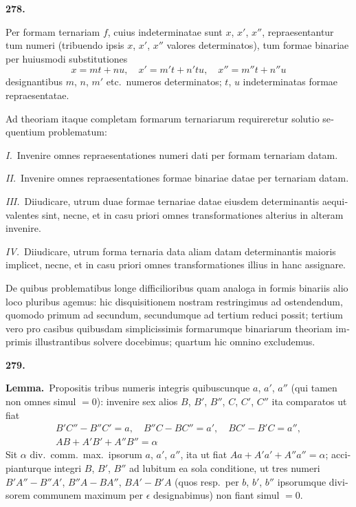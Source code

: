\documentclass[12pt,a4paper]{article}
\theoremstyle{plain}
\theoremstyle{definition}
\theoremstyle{remark}
\begin{document}
\begin{otherlanguage}{latin}

\textbf{278.}

Per formam ternariam $f$, cuius indeterminatae sunt $x$, $x'$, $x''$, repraesentantur tum numeri (tribuendo ipsis $x$, $x'$, $x''$ valores determinatos), tum formae binariae per huiusmodi substitutiones
\[
x = mt + nu, \quad x' = m't + n't u, \quad x'' = m''t + n''u
\]
designantibus $m$, $n$, $m'$ etc.\ numeros determinatos; $t$, $u$ indeterminatas formae repraesentatae.

Ad theoriam itaque completam formarum ternariarum requireretur solutio sequentium problematum:

\textit{I.}\ Invenire omnes repraesentationes numeri dati per formam ternariam datam.

\textit{II.}\ Invenire omnes repraesentationes formae binariae datae per ternariam datam.

\textit{III.}\ Diiudicare, utrum duae formae ternariae datae eiusdem determinantis aequivalentes sint, necne, et in casu priori omnes transformationes alterius in alteram invenire.

\textit{IV.}\ Diiudicare, utrum forma ternaria data aliam datam determinantis maioris implicet, necne, et in casu priori omnes transformationes illius in hanc assignare.

De quibus problematibus longe difficilioribus quam analoga in formis binariis alio loco pluribus agemus: hic disquisitionem nostram restringimus ad ostendendum, quomodo primum ad secundum, secundumque ad tertium reduci possit; tertium vero pro casibus quibusdam simplicissimis formarumque binariarum theoriam imprimis illustrantibus solvere docebimus; quartum hic omnino excludemus.

\bigskip

\textbf{279.}

\textbf{Lemma.}\ Propositis tribus numeris integris quibuscunque $a$, $a'$, $a''$ (qui tamen non omnes simul $= 0$): invenire sex alios $B$, $B'$, $B''$, $C$, $C'$, $C''$ ita comparatos ut fiat
\begin{gather*}
B'C'' - B''C' = a, \quad B''C - BC'' = a', \quad BC' - B'C = a'', \\
AB + A'B' + A''B'' = \alpha
\end{gather*}
Sit $\alpha$ div.\ comm.\ max.\ ipsorum $a$, $a'$, $a''$, ita ut fiat $Aa + A'a' + A''a'' = \alpha$; accipianturque integri $B$, $B'$, $B''$ ad lubitum ea sola conditione, ut tres numeri $B'A'' - B''A'$, $B''A - BA''$, $BA' - B'A$ (quos resp.\ per $b$, $b'$, $b''$ ipsorumque divisorem communem maximum per $\epsilon$ designabimus) non fiant simul $= 0$.


\end{otherlanguage}
\end{document}
